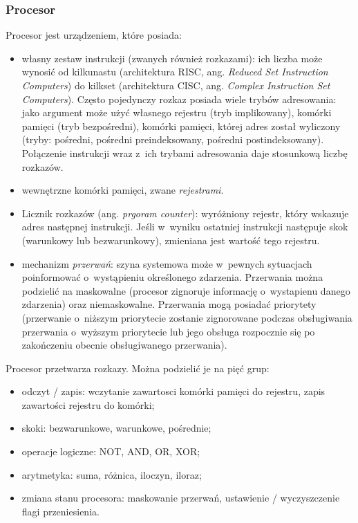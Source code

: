 \documentclass{mwart}
\begin{document}
\subsubsection{Procesor}
%
\indent
	Procesor jest urządzeniem, które posiada:
	\begin{itemize}
		\item własny zestaw instrukcji (zwanych również rozkazami): ich liczba może wynosić od kilkunastu (architektura RISC, 
			ang. \emph{Reduced Set Instruction Computers}) do kilkset (architektura CISC, ang.
			\emph{Complex Instruction Set Computers}). Często pojedynczy rozkaz posiada wiele trybów adresowania: jako argument
			może użyć własnego rejestru (tryb implikowany), komórki pamięci (tryb bezpośredni), komórki pamięci, której adres został wyliczony
			(tryby: pośredni, pośredni preindeksowany, pośredni postindeksowany). Połączenie instrukcji wraz z~ich trybami adresowania daje 
			stosunkową liczbę rozkazów.
		\item wewnętrzne komórki pamięci, zwane \emph{rejestrami}.
		\item Licznik rozkazów (ang. \emph{prgoram counter}): wyróżniony rejestr, który wskazuje adres następnej instrukcji. 
			Jeśli w~wyniku ostatniej instrukcji następuje skok (warunkowy lub bezwarunkowy), zmieniana jest wartość tego rejestru.
		\item mechanizm \emph{przerwań}: szyna systemowa może w~pewnych sytuacjach poinformować o~wystąpieniu określonego zdarzenia.
			Przerwania można podzielić na maskowalne (procesor zignoruje informację o~wystapienu danego zdarzenia) oraz niemaskowalne.
			Przerwania mogą posiadać priorytety (przerwanie o~niższym priorytecie zostanie zignorowane podczas obsługiwania przerwania
			o~wyższym priorytecie lub jego obsługa rozpocznie się po zakończeniu obecnie obsługiwanego przerwania).
	\end{itemize}
\par
%
\indent
	Procesor przetwarza rozkazy. Można podzielić je na pięć grup:
	\begin{itemize}
		\item odczyt / zapis: wczytanie zawartosci komórki pamięci do rejestru, zapis zawartości rejestru do komórki;
		\item skoki: bezwarunkowe, warunkowe, pośrednie;
		\item operacje logiczne: NOT, AND, OR, XOR;
		\item arytmetyka: suma, różnica, iloczyn, iloraz;
		\item zmiana stanu procesora: maskowanie przerwań, ustawienie / wyczyszczenie flagi przeniesienia.
	\end{itemize}
\end{document}
